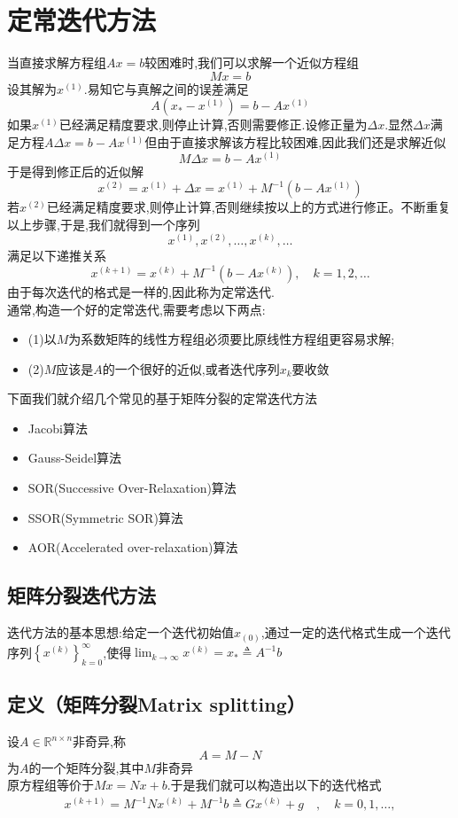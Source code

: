 \documentclass[12pt,a4paper]{article}
\begin{document}
\section{\color{blue} 定常迭代方法}
当直接求解方程组$Ax=b$较困难时,我们可以求解一个近似方程组
$$
M x=b
$$
设其解为$x^{(1)}$.易知它与真解之间的误差满足
$$
A\left(x_{*}-x^{(1)}\right)=b-A x^{(1)}
$$
如果$x^{(1)}$已经满足精度要求,则停止计算,否则需要修正.设修正量为$\Delta x$.显然$\Delta x$满足方程$A \Delta x=b-A x^{(1)}$但由于直接求解该方程比较困难,因此我们还是求解近似
$$
M \Delta x=b-A x^{(1)}
$$
于是得到修正后的近似解
$$x^{(2)}=x^{(1)}+\Delta x=x^{(1)}+M^{-1}\left(b-A x^{(1)}\right)$$
若$x^{(2)}$已经满足精度要求,则停止计算,否则继续按以上的方式进行修正。不断重复以上步骤,于是,我们就得到一个序列
$$
x^{(1)}, x^{(2)}, \ldots, x^{(k)}, \ldots
$$
满足以下递推关系
$$
x^{(k+1)}=x^{(k)}+M^{-1}\left(b-A x^{(k)}\right), \quad k=1,2, \ldots
$$
{\color{blue}由于每次迭代的格式是一样的,因此称为\quad 定常迭代.}\\
通常,构造一个好的定常迭代,需要考虑以下两点:
\begin{itemize}
\item (1)\quad 以$M$为系数矩阵的线性方程组必须要比原线性方程组更容易求解;
\item (2)\quad $M$应该是$A$的一个很好的近似,或者迭代序列${x_k}$要收敛
\end{itemize}
下面我们就介绍几个常见的基于矩阵分裂的定常迭代方法
\begin{itemize}
\item Jacobi算法
\item Gauss-Seidel算法
\item SOR(Successive Over-Relaxation)算法
\item SSOR(Symmetric SOR)算法
\item AOR(Accelerated over-relaxation)算法
\end{itemize}
\subsection{\color{blue}矩阵分裂迭代方法}
迭代方法的基本思想:给定一个迭代初始值$x_{(0)}$,通过一定的迭代格式生成一个迭代序列$\left\{x^{(k)}\right\}_{k=0}^{\infty}$,使得$\lim _{k \rightarrow \infty} x^{(k)}=x_{*} \triangleq A^{-1} b$
\subsection*{定义（矩阵分裂Matrix splitting）}设$A \in \mathbb{R}^{n \times n}$非奇异,称
$$
A=M-N
$$
为$A$的一个矩阵分裂,其中$M$非奇异\\
原方程组等价于$M x=N x+b$.于是我们就可以构造出以下的迭代格式
\begin{align}
x^{(k+1)}=M^{-1} N x^{(k)}+M^{-1} b \triangleq G x^{(k)}+g \quad, \quad k=0,1, \ldots,\tag{6.7}
\end{align}
\end{document}
